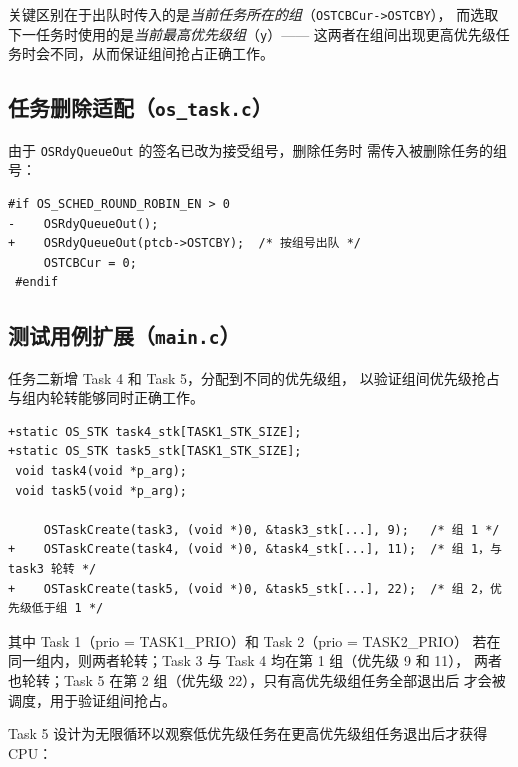 \documentclass[12pt,a4paper]{article}
\begin{document}
关键区别在于出队时传入的是\emph{当前任务所在的组}（\texttt{OSTCBCur->OSTCBY}），
而选取下一任务时使用的是\emph{当前最高优先级组}（\texttt{y}）——
这两者在组间出现更高优先级任务时会不同，从而保证组间抢占正确工作。

\subsection{任务删除适配（\texttt{os\_task.c}）}

由于 \texttt{OSRdyQueueOut} 的签名已改为接受组号，删除任务时
需传入被删除任务的组号：

\begin{lstlisting}[style=diffstyle,caption={os\_task.c — 任务删除出队（传入组号）}]
 #if OS_SCHED_ROUND_ROBIN_EN > 0
-    OSRdyQueueOut();
+    OSRdyQueueOut(ptcb->OSTCBY);  /* 按组号出队 */
     OSTCBCur = 0;
 #endif
\end{lstlisting}

\subsection{测试用例扩展（\texttt{main.c}）}

任务二新增 Task 4 和 Task 5，分配到不同的优先级组，
以验证组间优先级抢占与组内轮转能够同时正确工作。

\begin{lstlisting}[style=diffstyle,caption={main.c — 任务二测试任务（5 个任务，跨组）}]
+static OS_STK task4_stk[TASK1_STK_SIZE];
+static OS_STK task5_stk[TASK1_STK_SIZE];
 void task4(void *p_arg);
 void task5(void *p_arg);

     OSTaskCreate(task3, (void *)0, &task3_stk[...], 9);   /* 组 1 */
+    OSTaskCreate(task4, (void *)0, &task4_stk[...], 11);  /* 组 1，与 task3 轮转 */
+    OSTaskCreate(task5, (void *)0, &task5_stk[...], 22);  /* 组 2，优先级低于组 1 */
\end{lstlisting}

其中 Task 1（prio = TASK1\_PRIO）和 Task 2（prio = TASK2\_PRIO）
若在同一组内，则两者轮转；Task 3 与 Task 4 均在第 1 组（优先级 9 和 11），
两者也轮转；Task 5 在第 2 组（优先级 22），只有高优先级组任务全部退出后
才会被调度，用于验证组间抢占。

Task 5 设计为无限循环以观察低优先级任务在更高优先级组任务退出后才获得 CPU：
\end{document}
